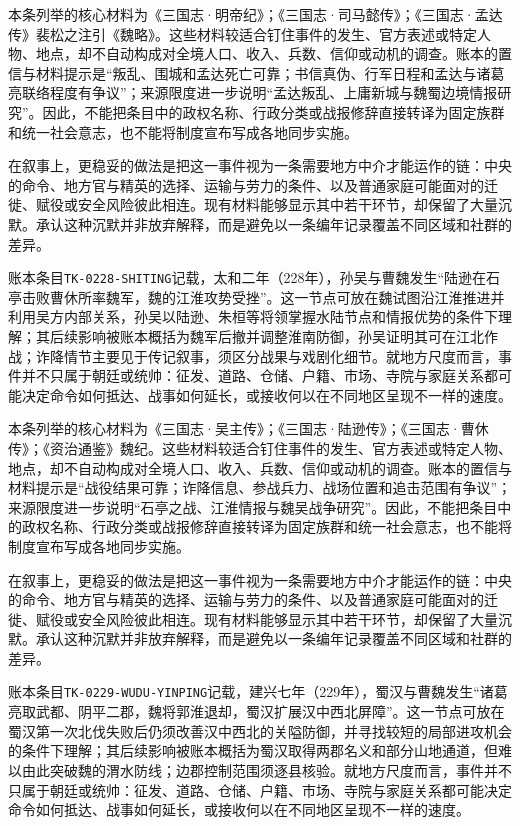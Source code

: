 本条列举的核心材料为《三国志·明帝纪》；《三国志·司马懿传》；《三国志·孟达传》裴松之注引《魏略》。这些材料较适合钉住事件的发生、官方表述或特定人物、地点，却不自动构成对全境人口、收入、兵数、信仰或动机的调查。账本的置信与材料提示是“叛乱、围城和孟达死亡可靠；书信真伪、行军日程和孟达与诸葛亮联络程度有争议”；来源限度进一步说明“孟达叛乱、上庸新城与魏蜀边境情报研究”。因此，不能把条目中的政权名称、行政分类或战报修辞直接转译为固定族群和统一社会意志，也不能将制度宣布写成各地同步实施。

在叙事上，更稳妥的做法是把这一事件视为一条需要地方中介才能运作的链：中央的命令、地方官与精英的选择、运输与劳力的条件、以及普通家庭可能面对的迁徙、赋役或安全风险彼此相连。现有材料能够显示其中若干环节，却保留了大量沉默。承认这种沉默并非放弃解释，而是避免以一条编年记录覆盖不同区域和社群的差异。

账本条目\texttt{TK-0228-SHITING}记载，太和二年（228年），孙吴与曹魏发生“陆逊在石亭击败曹休所率魏军，魏的江淮攻势受挫”。这一节点可放在魏试图沿江淮推进并利用吴方内部关系，孙吴以陆逊、朱桓等将领掌握水陆节点和情报优势的条件下理解；其后续影响被账本概括为魏军后撤并调整淮南防御，孙吴证明其可在江北作战；诈降情节主要见于传记叙事，须区分战果与戏剧化细节。就地方尺度而言，事件并不只属于朝廷或统帅：征发、道路、仓储、户籍、市场、寺院与家庭关系都可能决定命令如何抵达、战事如何延长，或接收何以在不同地区呈现不一样的速度。

本条列举的核心材料为《三国志·吴主传》；《三国志·陆逊传》；《三国志·曹休传》；《资治通鉴》魏纪。这些材料较适合钉住事件的发生、官方表述或特定人物、地点，却不自动构成对全境人口、收入、兵数、信仰或动机的调查。账本的置信与材料提示是“战役结果可靠；诈降信息、参战兵力、战场位置和追击范围有争议”；来源限度进一步说明“石亭之战、江淮情报与魏吴战争研究”。因此，不能把条目中的政权名称、行政分类或战报修辞直接转译为固定族群和统一社会意志，也不能将制度宣布写成各地同步实施。

在叙事上，更稳妥的做法是把这一事件视为一条需要地方中介才能运作的链：中央的命令、地方官与精英的选择、运输与劳力的条件、以及普通家庭可能面对的迁徙、赋役或安全风险彼此相连。现有材料能够显示其中若干环节，却保留了大量沉默。承认这种沉默并非放弃解释，而是避免以一条编年记录覆盖不同区域和社群的差异。

账本条目\texttt{TK-0229-WUDU-YINPING}记载，建兴七年（229年），蜀汉与曹魏发生“诸葛亮取武都、阴平二郡，魏将郭淮退却，蜀汉扩展汉中西北屏障”。这一节点可放在蜀汉第一次北伐失败后仍须改善汉中西北的关隘防御，并寻找较短的局部进攻机会的条件下理解；其后续影响被账本概括为蜀汉取得两郡名义和部分山地通道，但难以由此突破魏的渭水防线；边郡控制范围须逐县核验。就地方尺度而言，事件并不只属于朝廷或统帅：征发、道路、仓储、户籍、市场、寺院与家庭关系都可能决定命令如何抵达、战事如何延长，或接收何以在不同地区呈现不一样的速度。

